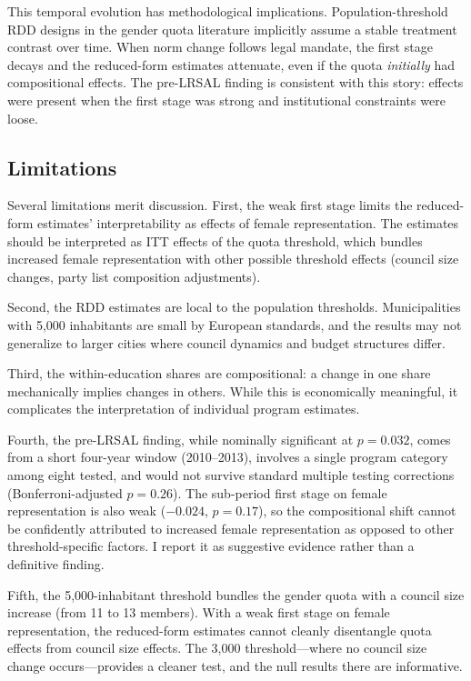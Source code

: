\documentclass[12pt]{article}
\begin{document}
This temporal evolution has methodological implications. Population-threshold RDD designs in the gender quota literature implicitly assume a stable treatment contrast over time. When norm change follows legal mandate, the first stage decays and the reduced-form estimates attenuate, even if the quota \emph{initially} had compositional effects. The pre-LRSAL finding is consistent with this story: effects were present when the first stage was strong and institutional constraints were loose.

\subsection{Limitations}

Several limitations merit discussion. First, the weak first stage limits the reduced-form estimates' interpretability as effects of female representation. The estimates should be interpreted as ITT effects of the quota threshold, which bundles increased female representation with other possible threshold effects (council size changes, party list composition adjustments).

Second, the RDD estimates are local to the population thresholds. Municipalities with 5,000 inhabitants are small by European standards, and the results may not generalize to larger cities where council dynamics and budget structures differ.

Third, the within-education shares are compositional: a change in one share mechanically implies changes in others. While this is economically meaningful, it complicates the interpretation of individual program estimates.

Fourth, the pre-LRSAL finding, while nominally significant at $p = 0.032$, comes from a short four-year window (2010--2013), involves a single program category among eight tested, and would not survive standard multiple testing corrections (Bonferroni-adjusted $p = 0.26$). The sub-period first stage on female representation is also weak ($-0.024$, $p = 0.17$), so the compositional shift cannot be confidently attributed to increased female representation as opposed to other threshold-specific factors. I report it as suggestive evidence rather than a definitive finding.

Fifth, the 5,000-inhabitant threshold bundles the gender quota with a council size increase (from 11 to 13 members). With a weak first stage on female representation, the reduced-form estimates cannot cleanly disentangle quota effects from council size effects. The 3,000 threshold---where no council size change occurs---provides a cleaner test, and the null results there are informative.
\end{document}
